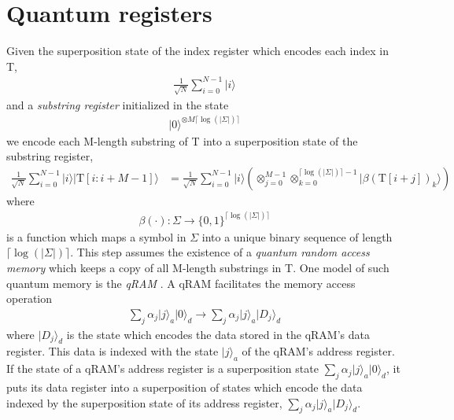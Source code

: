 \section{Quantum registers}
Given the superposition state of the index register which encodes each index in T,
\begin{align*}
	\frac{1}{\sqrt{N}} \sum_{i=0}^{N-1} \vert i \rangle
\end{align*}
and a \textit{substring register} initialized in the state
\begin{align*}
	\vert 0 \rangle^{\otimes M\lceil \log(\vert \Sigma \vert) \rceil}
\end{align*}
 we encode each M-length substring of T into a superposition state of the substring register,
\begin{align*}
	\frac{1}{\sqrt{N}} \sum_{i=0}^{N-1} \vert i \rangle \vert \text{T}[i:i+M-1] \rangle &= \frac{1}{\sqrt{N}} \sum_{i=0}^{N-1} \vert i \rangle \left( \otimes_{j=0}^{M-1}\otimes_{k=0}^{\lceil \log(\vert\Sigma\vert) \rceil-1} \vert \beta(\text{T}[i+j])_k \rangle\right)
\end{align*}
where
\begin{align*}
	\beta(\cdot): \Sigma \rightarrow \{0,1\}^{\lceil\log(\vert\Sigma\vert)\rceil}
\end{align*}
is a function which maps a symbol in $\Sigma$ into a unique binary sequence of length $\lceil \log(\vert\Sigma\vert) \rceil$. This step assumes the existence of a \textit{quantum random access memory} which keeps a copy of all M-length substrings in T. One model of such quantum memory is the \textit{qRAM} \cite{Giovanetti2008, Giovannetti2008a}. A qRAM facilitates the memory access operation
\begin{align*}
	\sum_{j} \alpha_{j} \vert j \rangle_{a} \vert 0 \rangle_{d} \rightarrow \sum_{j} \alpha_{j} \vert j \rangle_{a} \vert D_{j} \rangle_{d}
\end{align*}
where $\vert D_{j} \rangle_{d}$ is the state which encodes the data stored in the qRAM's data register. This data is indexed with the state $\vert j \rangle_{a}$ of the qRAM's address register. If the state of a qRAM's address register is a superposition state $\sum_{j} \alpha_{j} \vert j \rangle_{a} \vert 0 \rangle_{d}$, it puts its data register into a superposition of states which encode the data indexed by the superposition state of its address register, $\sum_{j} \alpha_{j} \vert j \rangle_{a} \vert D_{j} \rangle_{d}$.


